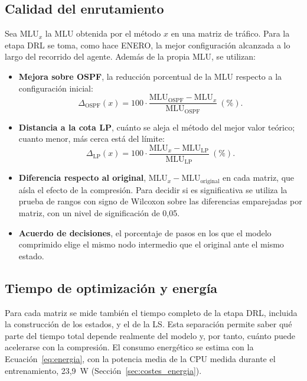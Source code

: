 \subsection{Calidad del enrutamiento}

Sea $\mathrm{MLU}_{x}$ la MLU obtenida por el método $x$ en una matriz de tráfico. Para la etapa DRL se toma, como hace ENERO, la mejor configuración alcanzada a lo largo del recorrido del agente. Además de la propia MLU, se utilizan:
\begin{itemize}
	\item \textbf{Mejora sobre OSPF}, la reducción porcentual de la MLU respecto a la configuración inicial:
	\begin{equation}\label{eq:mejora_ospf}
		\Delta_{\text{OSPF}}(x) = 100 \cdot \frac{\mathrm{MLU}_{\text{OSPF}} - \mathrm{MLU}_{x}}{\mathrm{MLU}_{\text{OSPF}}} \ (\%).
	\end{equation}
	\item \textbf{Distancia a la cota LP}, cuánto se aleja el método del mejor valor teórico; cuanto menor, más cerca está del límite:
	\begin{equation}\label{eq:margen_lp}
		\Delta_{\text{LP}}(x) = 100 \cdot \frac{\mathrm{MLU}_{x} - \mathrm{MLU}_{\text{LP}}}{\mathrm{MLU}_{\text{LP}}} \ (\%).
	\end{equation}
	\item \textbf{Diferencia respecto al original}, $\mathrm{MLU}_{x} - \mathrm{MLU}_{\text{original}}$ en cada matriz, que aísla el efecto de la compresión. Para decidir si es significativa se utiliza la prueba de rangos con signo de Wilcoxon \cite{wilcoxon1945individual} sobre las diferencias emparejadas por matriz, con un nivel de significación de 0,05.
	\item \textbf{Acuerdo de decisiones}, el porcentaje de pasos en los que el modelo comprimido elige el mismo nodo intermedio que el original ante el mismo estado.
\end{itemize}

\subsection{Tiempo de optimización y energía}

Para cada matriz se mide también el tiempo completo de la etapa DRL, incluida la construcción de los estados, y el de la LS. Esta separación permite saber qué parte del tiempo total depende realmente del modelo y, por tanto, cuánto puede acelerarse con la compresión. El consumo energético se estima con la Ecuación~\eqref{eq:energia}, con la potencia media de la CPU medida durante el entrenamiento, 23,9~W (Sección~\ref{sec:costes_energia}).

